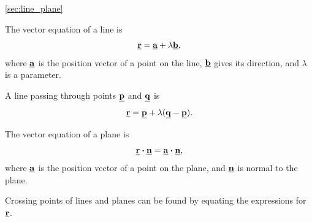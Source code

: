 \begin{recap}{\ref{sec:line_plane}}
\item The vector equation of a line is
\[
\underline{\mathbf{r}}=\underline{\mathbf{a}}+\lambda\underline{\mathbf{b}},
\]
where $\underline{\mathbf{a}}$ is the position vector of a point on the line, $\underline{\mathbf{b}}$ gives its direction, and $\lambda$ is a parameter.
\item A line passing through points $\underline{\mathbf{p}}$ and $\underline{\mathbf{q}}$ is
\[
\underline{\mathbf{r}}=\underline{\mathbf{p}}+\lambda(\underline{\mathbf{q}}-\underline{\mathbf{p}}).
\]
\item The vector equation of a plane is
\[
\underline{\mathbf{r}}\boldsymbol{\cdot}\underline{\mathbf{n}}
=\underline{\mathbf{a}}\boldsymbol{\cdot}\underline{\mathbf{n}},
\]
where $\underline{\mathbf{a}}$ is the position vector of a point on the plane, and $\underline{\mathbf{n}}$ is normal to the plane.
\item Crossing points of lines and planes can be found by equating the expressions for $\underline{\mathbf{r}}$.
\end{recap}







